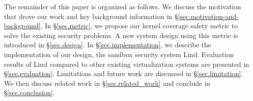 The remainder of this paper is organized as follows. 
We discuss the motivation that drove our work and key background information in \S{\ref{sec.motivation-and-background}}. 
In \S{\ref{sec.metric}}, we propose our kernel coverage safety metric to solve the existing security problems. 
A new system design using this metric is introduced in \S{\ref{sec.design}}. In \S{\ref{sec.implementation}}, 
we describe the implementation of our design, 
the sandbox security system Lind. Evaluation results of Lind compared to 
other existing virtualization systems are presented in \S{\ref{sec.evaluation}}. Limitations and future work are discussed in \S{\ref{sec.limitation}}. 
We then discuss related work in \S{\ref{sec.related_work}} and conclude in \S{\ref{sec.conclusion}}.